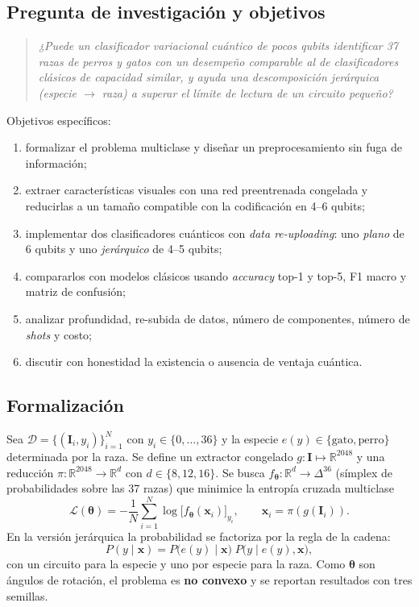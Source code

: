 \documentclass[11pt,letterpaper]{article}
\newcommand{\R}{\mathbb{R}}
\begin{document}
\subsection{Pregunta de investigación y objetivos}
\begin{quote}
\emph{¿Puede un clasificador variacional cuántico de pocos qubits identificar 37 razas de perros y
gatos con un desempeño comparable al de clasificadores clásicos de capacidad similar, y ayuda una
descomposición jerárquica (especie $\to$ raza) a superar el límite de lectura de un circuito pequeño?}
\end{quote}
Objetivos específicos:
\begin{enumerate}[label=(\roman*),leftmargin=*]
\item formalizar el problema multiclase y diseñar un preprocesamiento sin fuga de información;
\item extraer características visuales con una red preentrenada congelada y reducirlas a un tamaño
compatible con la codificación en 4--6 qubits;
\item implementar dos clasificadores cuánticos con \emph{data re-uploading}: uno \emph{plano} de 6
qubits y uno \emph{jerárquico} de 4--5 qubits;
\item compararlos con modelos clásicos usando \emph{accuracy} top-1 y top-5, F1 macro y matriz de
confusión;
\item analizar profundidad, re-subida de datos, número de componentes, número de \emph{shots} y costo;
\item discutir con honestidad la existencia o ausencia de ventaja cuántica.
\end{enumerate}

\subsection{Formalización}
Sea $\mathcal{D}=\{(\bm{I}_i,y_i)\}_{i=1}^{N}$ con $y_i\in\{0,\dots,36\}$ y la especie
$e(y)\in\{\text{gato},\text{perro}\}$ determinada por la raza. Se define un extractor congelado
$g:\bm{I}\mapsto\R^{2048}$ y una reducción $\pi:\R^{2048}\to\R^{d}$ con $d\in\{8,12,16\}$. Se busca
$f_{\bm\theta}:\R^{d}\to\Delta^{36}$ (símplex de probabilidades sobre las 37 razas) que minimice la
entropía cruzada multiclase
\begin{equation}
\mathcal{L}(\bm\theta)=-\frac{1}{N}\sum_{i=1}^{N}\log\big[f_{\bm\theta}(\bm{x}_i)\big]_{y_i},
\qquad \bm{x}_i=\pi(g(\bm{I}_i)).
\label{eq:loss}
\end{equation}
En la versión jerárquica la probabilidad se factoriza por la regla de la cadena:
\begin{equation}
P(y\mid\bm{x})=P\big(e(y)\mid\bm{x}\big)\;P\big(y\mid e(y),\bm{x}\big),
\label{eq:jerarquia}
\end{equation}
con un circuito para la especie y uno por especie para la raza. Como $\bm\theta$ son ángulos de
rotación, el problema es \textbf{no convexo} y se reportan resultados con tres semillas.
\end{document}
